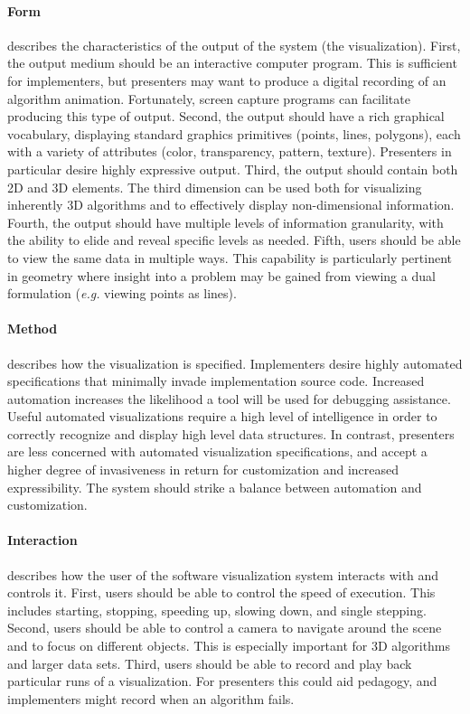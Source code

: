 \paragraph{Form} describes the characteristics of the output of the system (the
visualization). First, the output medium should be an interactive computer
program. This is sufficient for implementers, but presenters may want to produce
a digital recording of an algorithm animation. Fortunately, screen capture
programs can facilitate producing this type of output. Second, the output should
have a rich graphical vocabulary, displaying standard graphics primitives
(points, lines, polygons), each with a variety of attributes (color,
transparency, pattern, texture). Presenters in particular desire highly
expressive output. Third, the output should contain both 2D and 3D elements.
The third dimension can be used both for visualizing inherently 3D algorithms
and to effectively display non-dimensional information. Fourth, the output
should have multiple levels of information granularity, with the ability to
elide and reveal specific levels as needed. Fifth, users should be able to view
the same data in multiple ways. This capability is particularly pertinent in
geometry where insight into a problem may be gained from viewing a dual
formulation (\emph{e.g.} viewing points as lines).

\paragraph{Method} describes how the visualization is specified. Implementers
desire highly automated specifications that minimally invade implementation source
code. Increased automation increases the likelihood a tool will be used for
debugging assistance. Useful automated visualizations require a high level of
intelligence in order to correctly recognize and display high level data
structures. In contrast, presenters are less concerned with automated
visualization specifications, and accept a higher degree of invasiveness in
return for customization and increased expressibility. The system should strike
a balance between automation and customization.

\paragraph{Interaction} describes how the user of the software visualization
system interacts with and controls it. First, users should be able to control
the speed of execution. This includes starting, stopping, speeding up, slowing
down, and single stepping. Second, users should be able to control a camera to
navigate around the scene and to focus on different objects. This is especially
important for 3D algorithms and larger data sets. Third, users should be able to
record and play back particular runs of a visualization. For presenters this
could aid pedagogy, and implementers might record when an algorithm fails.

